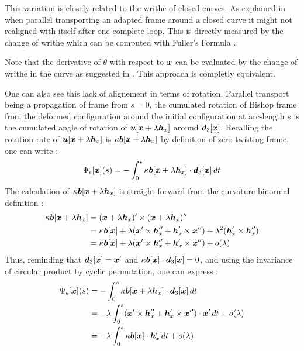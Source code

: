 This variation is closely related to the writhe of closed curves. As explained in \cite{Fuller1978} when parallel transporting an adapted frame around a closed curve it might not realigned with itself after one complete loop. This  is directly measured by the change of writhe which can be computed with Fuller's Formula \cite{Fuller1978}.

Note that the derivative of $\theta$ with respect to $\boldsymbol{x}$ can be evaluated by the change of writhe in the curve as suggested in \cite{deVries2005}. This approach is completly equivalent.

One can also see this lack of alignement in terms of rotation. Parallel transport being a propagation of frame from $s = 0$, the cumulated rotation of Bishop frame from the deformed configuration around the initial configuration at arc-length $s$ is the cumulated angle of rotation of $\boldsymbol{u}[\boldsymbol{x} + \lambda\boldsymbol{h}_x]$ around $\boldsymbol{d}_3[\boldsymbol{x}]$. Recalling the rotation rate of $\boldsymbol{u}[\boldsymbol{x} + \lambda\boldsymbol{h}_x]$ is $\kappa\boldsymbol{b}[\boldsymbol{x} + \lambda\boldsymbol{h}_x]$ by definition of zero-twisting frame, one can write :
\begin{equation}
	\Psi_\epsilon[\boldsymbol{x}](s) =
	-\int_0^s \kappa\boldsymbol{b}[\boldsymbol{x} + \lambda\boldsymbol{h}_x] \cdot \boldsymbol{d}_3[\boldsymbol{x}] \,dt
\end{equation}
The calculation of $\kappa\boldsymbol{b}[\boldsymbol{x} + \lambda\boldsymbol{h}_x]$ is straight forward from the curvature binormal definition :
\begin{equation}
	\begin{aligned}
	\kappa\boldsymbol{b}[\boldsymbol{x} + \lambda\boldsymbol{h}_x]
	&= (\boldsymbol{x} + \lambda\boldsymbol{h}_x)' \times (\boldsymbol{x} + \lambda\boldsymbol{h}_x)'' \\
	&= \kappa\boldsymbol{b}[\boldsymbol{x}] + \lambda(\boldsymbol{x}'\times\boldsymbol{h}''_x + \boldsymbol{h}'_x\times\boldsymbol{x}'') + \lambda^2(\boldsymbol{h}'_x \times \boldsymbol{h}''_x) \\
	&= \kappa\boldsymbol{b}[\boldsymbol{x}] + \lambda(\boldsymbol{x}'\times\boldsymbol{h}''_x + \boldsymbol{h}'_x\times\boldsymbol{x}'') + o(\lambda)
	\end{aligned}
\end{equation}
Thus, reminding that $\boldsymbol{d}_3[\boldsymbol{x}] = \boldsymbol{x}'$ and $\kappa\boldsymbol{b}[\boldsymbol{x}]\cdot\boldsymbol{d}_3[\boldsymbol{x}] = 0$, and using the invariance of circular product by cyclic permutation, one can express :
\begin{equation}
	\begin{aligned}
		\Psi_\epsilon[\boldsymbol{x}](s)
		&= -\int_0^s \kappa\boldsymbol{b}[\boldsymbol{x} + \lambda\boldsymbol{h}_x] \cdot \boldsymbol{d}_3[\boldsymbol{x}] \,dt\\
		&= - \lambda \int_0^s (\boldsymbol{x}'\times\boldsymbol{h}''_x + \boldsymbol{h}'_x\times\boldsymbol{x}'') \cdot \boldsymbol{x}' \,dt + o(\lambda)\\
		&= - \lambda \int_0^s \kappa\boldsymbol{b}[\boldsymbol{x}]\cdot\boldsymbol{h}'_x \,dt + o(\lambda)\\
	\end{aligned}
\end{equation}

